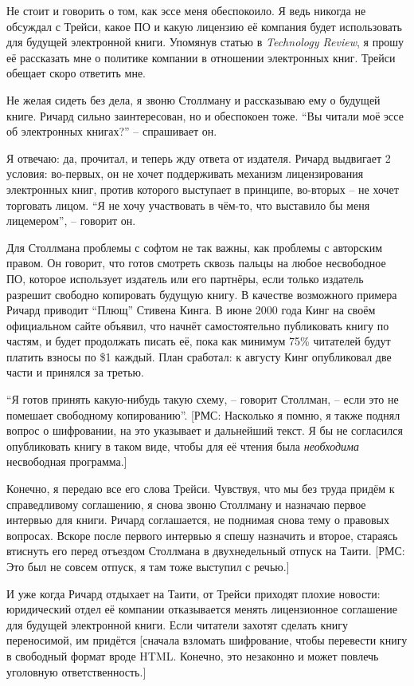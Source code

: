 Не стоит и говорить о том, как эссе меня обеспокоило. Я ведь никогда не обсуждал с Трейси, какое ПО и какую лицензию её компания будет использовать для будущей электронной книги. Упомянув статью в \textit{Technology Review}, я прошу её рассказать мне о политике компании в отношении электронных книг. Трейси обещает скоро ответить мне.

Не желая сидеть без дела, я звоню Столлману и рассказываю ему о будущей книге. Ричард сильно заинтересован, но и обеспокоен тоже. \enquote{Вы читали моё эссе об электронных книгах?} -- спрашивает он.

Я отвечаю: да, прочитал, и теперь жду ответа от издателя. Ричард выдвигает 2 условия: во-первых, он не хочет поддерживать механизм лицензирования электронных книг, против которого выступает в принципе, во-вторых -- не хочет торговать лицом. \enquote{Я не хочу участвовать в чём-то, что выставило бы меня лицемером}, -- говорит он.

Для Столлмана проблемы с софтом не так важны, как проблемы с авторским правом. Он говорит, что готов смотреть сквозь пальцы на любое несвободное ПО, которое использует издатель или его партнёры, если только издатель разрешит свободно копировать будущую книгу. В качестве возможного примера Ричард приводит \enquote{Плющ} Стивена Кинга. В июне 2000 года Кинг на своём официальном сайте объявил, что начнёт самостоятельно публиковать книгу по частям, и будет продолжать писать её, пока как минимум 75\% читателей будут платить взносы по \$1 каждый. План сработал: к августу Кинг опубликовал две части и принялся за третью.

\enquote{Я готов принять какую-нибудь такую схему, -- говорит Столлман, -- если это не помешает свободному копированию}. [РМС: Насколько я помню, я также поднял вопрос о шифровании, на это указывает и дальнейший текст. Я бы не согласился опубликовать книгу в таком виде, чтобы для её чтения была \textit{необходима} несвободная программа.]

Конечно, я передаю все его слова Трейси. Чувствуя, что мы без труда придём к справедливому соглашению, я снова звоню Столлману и назначаю первое интервью для книги. Ричард соглашается, не поднимая снова тему о правовых вопросах. Вскоре после первого интервью я спешу назначить и второе, стараясь втиснуть его перед отъездом Столлмана в двухнедельный отпуск на Таити. [РМС: Это был не совсем отпуск, я там тоже выступил с речью.]

И уже когда Ричард отдыхает на Таити, от Трейси приходят плохие новости: юридический отдел её компании отказывается менять лицензионное соглашение для будущей электронной книги. Если читатели захотят сделать книгу переносимой, им придётся [сначала взломать шифрование, чтобы перевести книгу в свободный формат вроде HTML. Конечно, это незаконно и может повлечь уголовную ответственность.]

